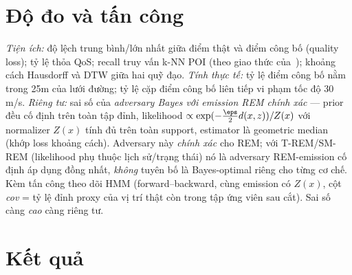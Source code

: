 \section{Độ đo và tấn công}

\emph{Tiện ích:} độ lệch trung bình/lớn nhất giữa điểm thật và điểm công bố
(quality loss); tỷ lệ thỏa QoS; recall truy vấn k-NN POI (theo giao thức
của~\cite{xiao2015protecting}); khoảng cách Hausdorff và DTW giữa hai quỹ đạo.
\emph{Tính thực tế:} tỷ lệ điểm công bố nằm trong 25m của lưới đường; tỷ lệ cặp
điểm công bố liên tiếp vi phạm tốc độ 30 m/s.
\emph{Riêng tư:} sai số của \emph{adversary Bayes với emission REM chính xác}
--- prior đều cố định trên toàn tập đỉnh, likelihood
$\propto \exp(-\tfrac{\eps}{2}d(x,z))/Z(x)$ với normalizer $Z(x)$ tính đủ trên
toàn support, estimator là geometric median (khớp loss khoảng cách). Adversary
này \emph{chính xác} cho REM; với T-REM/SM-REM (likelihood phụ thuộc lịch sử/trạng
thái) nó là adversary REM-emission cố định áp dụng đồng nhất, \emph{không} tuyên
bố là Bayes-optimal riêng cho từng cơ chế. Kèm tấn công theo dõi HMM
(forward--backward, cùng emission có $Z(x)$, cột \emph{cov} = tỷ lệ đỉnh proxy của
vị trí thật còn trong tập ứng viên sau cắt). Sai số càng \emph{cao} càng riêng tư.

\section{Kết quả}

